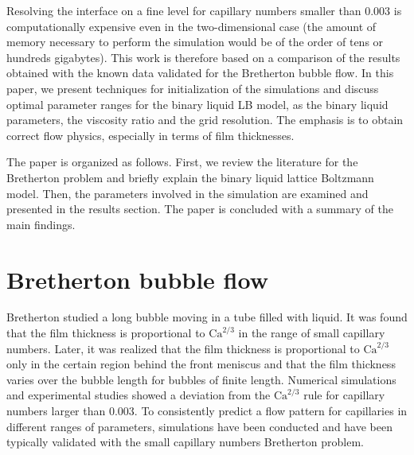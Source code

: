 \documentclass[preprint,12pt]{elsarticle}
\newcommand{\Ca}{\mathrm{Ca}}
\begin{document}
Resolving the interface on a fine level for capillary numbers smaller than
$0.003$ is computationally expensive even in the two-dimensional case
(the amount of memory necessary to perform the simulation would be of the order
of tens or hundreds gigabytes).  This work is therefore based on a
comparison of the results obtained with the known data
validated for the Bretherton bubble flow.  In this paper, we present
techniques for initialization of the simulations and discuss optimal
parameter ranges for the binary liquid LB model, as the binary liquid parameters, the viscosity
ratio and the grid resolution. The emphasis is to obtain correct flow physics, especially in terms
of film thicknesses.


The paper is organized as follows.  First, we review the literature
for the Bretherton problem and briefly
explain the binary liquid lattice Boltzmann model. Then, the parameters involved in the
simulation are examined and presented in the results section. The paper is
concluded with a summary of the main findings.

\section{Bretherton bubble flow}
Bretherton \cite{bretherton} studied a long bubble
moving in a tube filled with liquid. It was found that the film thickness
is proportional to $\Ca^{2/3}$ in the range of small capillary numbers. Later,
it was realized \cite{wong-films,wong-pressure} that the film thickness
is proportional to $\Ca^{2/3}$ only in the certain region behind the front meniscus and
that the film thickness
varies over the bubble length for bubbles of finite length. Numerical
simulations \cite{giavedoni-numerical} and experimental studies
\cite{kreutzer-pressure-drop} showed a deviation from the $\Ca^{2/3}$ rule for capillary numbers
larger than $0.003$.
To consistently  predict a flow pattern for capillaries in
different ranges of parameters, simulations have been conducted and have been typically validated with the
small capillary numbers Bretherton problem.
\end{document}
